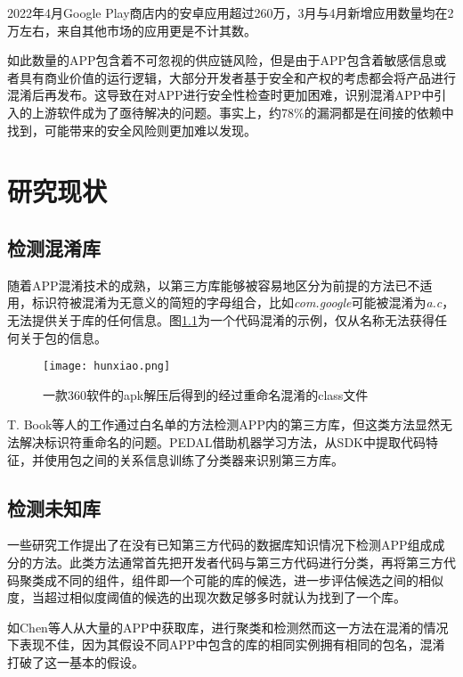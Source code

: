 2022年4月Google Play商店内的安卓应用超过260万，3月与4月新增应用数量均在2万左右，来自其他市场的应用更是不计其数。

如此数量的APP包含着不可忽视的供应链风险，但是由于APP包含着敏感信息或者具有商业价值的运行逻辑，大部分开发者基于安全和产权的考虑都会将产品进行混淆后再发布。这导致在对APP进行安全性检查时更加困难，识别混淆APP中引入的上游软件成为了亟待解决的问题。事实上，约78\%的漏洞都是在间接的依赖中找到，可能带来的安全风险则更加难以发现\cite{qianxin.com}。






\chapter{研究现状}

\section{检测混淆库}
随着APP混淆技术的成熟，以第三方库能够被容易地区分为前提的方法已不适用，标识符被混淆为无意义的简短的字母组合，比如\textit{com.google}可能被混淆为\textit{a.c}，无法提供关于库的任何信息。图\ref{fig:hunxiao}为一个代码混淆的示例，仅从名称无法获得任何关于包的信息。

\begin{figure}[!htp]
  \centering
  \texttt{[image: hunxiao.png]} \\
  \caption{一款360软件的apk解压后得到的经过重命名混淆的class文件}
 \label{fig:hunxiao}
\end{figure}

T. Book等人的工作通过白名单的方法检测APP内的第三方库\cite{book2013longitudinal}，但这类方法显然无法解决标识符重命名的问题。PEDAL\cite{liu2015efficient}借助机器学习方法，从SDK中提取代码特征，并使用包之间的关系信息训练了分类器来识别第三方库。


\section{检测未知库}

一些研究工作提出了在没有已知第三方代码的数据库知识情况下检测APP组成成分的方法。此类方法通常首先把开发者代码与第三方代码进行分类，再将第三方代码聚类成不同的组件，组件即一个可能的库的候选，进一步评估候选之间的相似度，当超过相似度阈值的候选的出现次数足够多时就认为找到了一个库。

如Chen等人\cite{chen2016following}从大量的APP中获取库，进行聚类和检测然而这一方法在混淆的情况下表现不佳，因为其假设不同APP中包含的库的相同实例拥有相同的包名，混淆打破了这一基本的假设。

